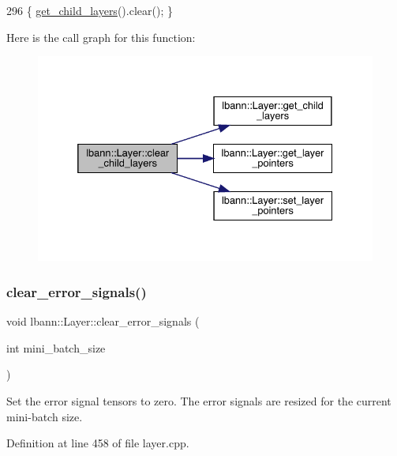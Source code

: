 \begin{DoxyCode}
296 \{ \hyperlink{classlbann_1_1Layer_aa0058c8ec4913efc3e4de5d6f61eb8db}{get\_child\_layers}().clear(); \}
\end{DoxyCode}
Here is the call graph for this function\+:\nopagebreak
\begin{figure}[H]
\begin{center}
\leavevmode
\includegraphics[width=332pt]{classlbann_1_1Layer_a040bf53e261b1ef796739c09b3362a3a_cgraph}
\end{center}
\end{figure}
\mbox{\label{classlbann_1_1Layer_aa1389a70b804debaac6953b3b1147593}} 
\subsubsection{\texorpdfstring{clear\+\_\+error\+\_\+signals()}{clear\_error\_signals()}}
{\footnotesize\ttfamily void lbann\+::\+Layer\+::clear\+\_\+error\+\_\+signals (\begin{DoxyParamCaption}\item[{int}]{mini\+\_\+batch\+\_\+size }\end{DoxyParamCaption})\hspace{0.3cm}{\ttfamily [virtual]}}

Set the error signal tensors to zero. The error signals are resized for the current mini-\/batch size. 

Definition at line 458 of file layer.\+cpp.



